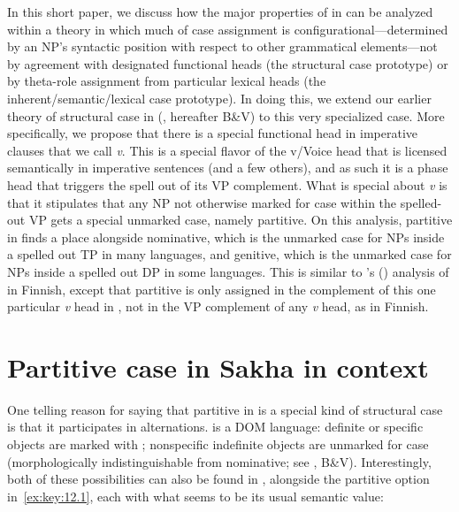 \documentclass[output=paper]{langsci/langscibook}
\begin{document}
\largerpage[1]
In this short paper, we discuss how the major properties of  in  can be analyzed within a theory in which much of case assignment
is configurational—determined by an NP’s syntactic position with respect to
other grammatical elements—not by agreement with designated functional heads
(the structural case prototype) or by theta-role assignment from particular
lexical heads (the inherent/semantic/lexical case prototype). In doing this, we
extend our earlier theory of structural case in 
(\citealt{BakVin2010}, hereafter B\&V) to this very specialized case. More
specifically, we propose that there is a special functional head in imperative
clauses that we call \emph{v}\textsubscript{\Imp}. This is a special flavor of
the v/Voice head that is licensed semantically in imperative sentences (and a
few others), and as such it is a phase head that triggers the spell out of its
VP complement. What is special about \emph{v}\textsubscript{\Imp} is that it
stipulates that any NP not otherwise marked for case within the spelled-out VP
gets a special unmarked case, namely partitive. On this analysis, partitive in
 finds a place alongside nominative, which is the unmarked case for
NPs inside a spelled out TP in many languages, and genitive,
which is the unmarked case for NPs inside a spelled out DP in some languages.
This is similar to \citeauthor{Baker2015}'s (\citeyear[140--145]{Baker2015})
analysis of  in Finnish, except that partitive is only
assigned in the complement of this one particular \emph{v} head in ,
not in the VP complement of any \emph{v} head, as in Finnish.

\section{Partitive case in Sakha in context}

One telling reason for saying that partitive in  is a special kind
of structural case is that it participates in alternations.  is a
\gls{DOM} language: definite or specific objects are marked with
; nonspecific indefinite objects are unmarked for case
(morphologically indistinguishable from nominative; see
\citealt{Vinokurova2005}, B\&V).  Interestingly, both of these possibilities
can also be found in , alongside the partitive option
in~\eqref{ex:key:12.1}, each with what seems to be its usual semantic value:
\end{document}
